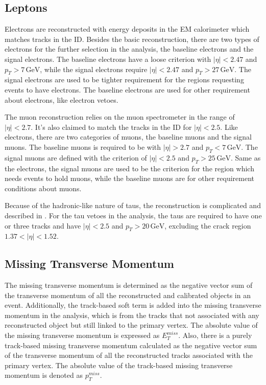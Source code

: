 \documentclass[class=NTHU_thesis, crop=false]{standalone}
\begin{document}
\subsection{Leptons}
Electrons are reconstructed with energy deposits in the EM calorimeter which matches tracks in the ID. Besides the basic reconstruction, there are two types of electrons for the further selection in the analysis, the baseline electrons and the signal electrons. The baseline electrons have a loose criterion with $\left|\eta\right| < 2.47$ and $p_T > 7\, \mathrm{GeV}$, while the signal electrons require $\left|\eta\right| < 2.47$ and $p_T > 27\, \mathrm{GeV}$. The signal electrons are used to be tighter requirement for the regions requesting events to have electrons. The baseline electrons are used for other requirement about electrons, like electron vetoes.

The muon reconstruction relies on the muon spectrometer in the range of $\left|\eta\right| < 2.7$. It's also claimed to match the tracks in the ID for $\left|\eta\right| < 2.5$. Like electrons, there are two categories of muons, the baseline muons and the signal muons. The baseline muons is required to be with $\left|\eta\right| > 2.7$ and $p_T < 7\, \mathrm{GeV}$. The signal muons are defined with the criterion of $\left|\eta\right| < 2.5$ and $p_T > 25\, \mathrm{GeV}$. Same as the electrons, the signal muons are used to be the criterion for the region which needs events to hold muons, while the baseline muons are for other requirement conditions about muons.

Because of the hadronic-like nature of taus, the reconstruction is complicated and described in \cite{ATLAS-CONF-2017-029}. For the tau vetoes in the analysis, the taus are required to have one or three tracks and have $\left|\eta\right| < 2.5$ and $p_T > 20\, \mathrm{GeV}$, excluding the crack region $1.37 < \left|\eta\right| < 1.52$.

\subsection{Missing Transverse Momentum}
The missing transverse momentum is determined as the negative vector sum of the transverse momentum of all the reconstructed and calibrated objects in an event. Additionally, the track-based soft term is added into the missing transverse momentum in the analysis, which is from the tracks that not associated with any reconstructed object but still linked to the primary vertex. The absolute value of the missing transverse momentum is expressed as $E^{miss}_T$. Also, there is a purely track-based missing transverse momentum calculated as the negative vector sum of the transverse momentum of all the reconstructed tracks associated with the primary vertex. The absolute value of the track-based missing transverse momentum is denoted as $p^{miss}_T$.
\end{document}
